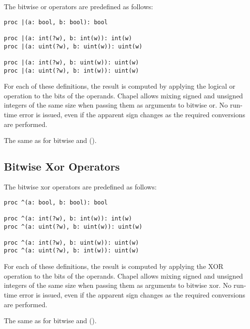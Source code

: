 The bitwise or operators are predefined as follows:
\begin{chapel}
\begin{verbatim}
proc |(a: bool, b: bool): bool

proc |(a: int(?w), b: int(w)): int(w)
proc |(a: uint(?w), b: uint(w)): uint(w)

proc |(a: int(?w), b: uint(w)): uint(w)
proc |(a: uint(?w), b: int(w)): uint(w)
\end{verbatim}
\end{chapel}

For each of these definitions, the result is
computed by applying the logical or operation to the bits of the
operands.
Chapel allows mixing signed and unsigned integers of the same size
when passing them as arguments to bitwise or.
No run-time error is issued, even if the apparent sign changes as the
required conversions are performed.

\begin{rationale}
The same as for bitwise and ().
\end{rationale}

\subsection{Bitwise Xor Operators}
\label{Bitwise_Xor_Operators}

The bitwise xor operators are predefined as follows:
\begin{chapel}
\begin{verbatim}
proc ^(a: bool, b: bool): bool

proc ^(a: int(?w), b: int(w)): int(w)
proc ^(a: uint(?w), b: uint(w)): uint(w)

proc ^(a: int(?w), b: uint(w)): uint(w)
proc ^(a: uint(?w), b: int(w)): uint(w)
\end{verbatim}
\end{chapel}

For each of these definitions, the result is
computed by applying the XOR operation to the bits of the operands.
Chapel allows mixing signed and unsigned integers of the same size
when passing them as arguments to bitwise xor.
No run-time error is issued, even if the apparent sign changes as the required
conversions are performed.

\begin{rationale}
The same as for bitwise and ().
\end{rationale}

